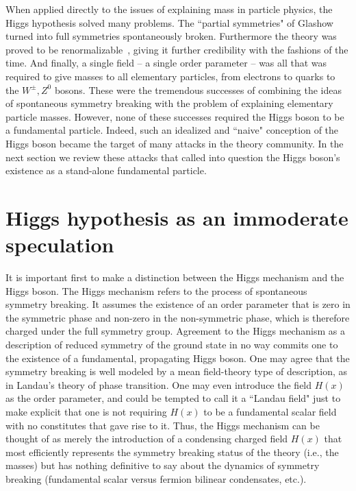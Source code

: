 \documentclass[letter,12pt]{article}
\begin{document}
When applied directly to the issues of explaining mass in particle physics, the Higgs hypothesis solved many problems. The ``partial symmetries" of Glashow~\cite{Glashow:1961tr} turned into full symmetries spontaneously broken. Furthermore the theory was proved to be renormalizable~\cite{'tHooft:1971rn}, giving it further credibility with the fashions of the time. And finally, a single field -- a single order parameter -- was all that was required to give masses to all elementary particles, from electrons to quarks to the $W^\pm,Z^0$ bosons. These were the tremendous successes of combining the ideas of spontaneous symmetry breaking with the problem of explaining elementary particle masses. However, none of these successes required the Higgs boson to be a fundamental particle. Indeed, such an idealized and ``naive" conception of the Higgs boson became the target of many attacks in the theory community.
In the next section we review these attacks that called into question the Higgs boson's existence as a stand-alone fundamental particle. 

\section{Higgs hypothesis as an immoderate speculation}
\label{sec:speculation}

It is important first to make a distinction between the Higgs mechanism and the Higgs boson.  The Higgs mechanism refers to the process of spontaneous symmetry breaking. It assumes the existence of an order parameter that is zero in the symmetric phase and non-zero in the non-symmetric phase, which is therefore charged under the full symmetry group. Agreement to the Higgs mechanism as a description of reduced symmetry of the ground state in no way commits one to the existence of a fundamental, propagating Higgs boson. One may agree that the symmetry breaking is well modeled by a mean field-theory type of description, as in Landau's theory of phase transition.  One may even introduce the field $H(x)$ as the order parameter, and could be tempted to call it a ``Landau field" just to make explicit that one is not requiring $H(x)$ to be a fundamental scalar field with no constitutes that gave rise to it.  Thus, the Higgs mechanism can be thought of as merely the introduction of a condensing charged field $H(x)$ that most efficiently represents the symmetry breaking status of the theory (i.e., the masses) but has nothing definitive to say about the dynamics of symmetry breaking (fundamental scalar versus fermion bilinear condensates, etc.).
\end{document}
